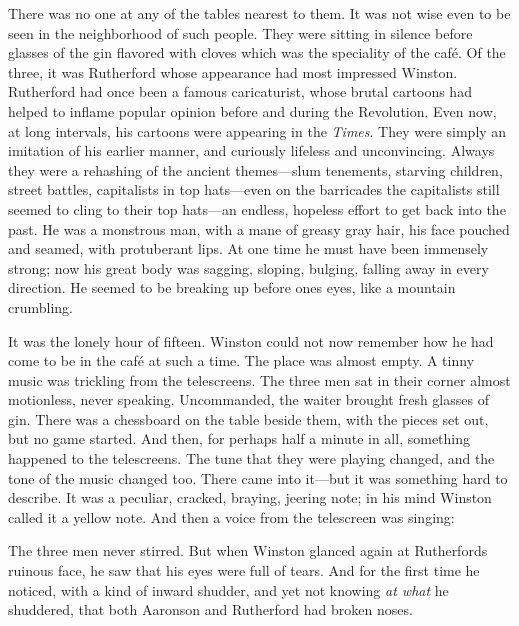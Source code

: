 There was no one at any of the tables nearest to them. It was not wise
even to be seen in the neighborhood of such people. They were sitting in
silence before glasses of the gin flavored with cloves which was the
speciality of the café. Of the three, it was Rutherford whose appearance
had most impressed Winston. Rutherford had once been a famous
caricaturist, whose brutal cartoons had helped to inflame popular
opinion before and during the Revolution. Even now, at long intervals,
his cartoons were appearing in the \emph{Times}. They were simply an
imitation of his earlier manner, and curiously lifeless and
unconvincing. Always they were a rehashing of the ancient themes---slum
tenements, starving children, street battles, capitalists in top
hats---even on the barricades the capitalists still seemed to cling to
their top hats---an endless, hopeless effort to get back into the past.
He was a monstrous man, with a mane of greasy gray hair, his face
pouched and seamed, with protuberant lips. At one time he must have been
immensely strong; now his great body was sagging, sloping, bulging,
falling away in every direction. He seemed to be breaking up before
one\textquotesingle s eyes, like a mountain crumbling.

It was the lonely hour of fifteen. Winston could not now remember how he
had come to be in the café at such a time. The place was almost empty. A
tinny music was trickling from the telescreens. The three men sat in
their corner almost motionless, never speaking. Uncommanded, the waiter
brought fresh glasses of gin. There was a chessboard on the table beside
them, with the pieces set out, but no game started. And then, for
perhaps half a minute in all, something happened to the telescreens. The
tune that they were playing changed, and the tone of the music changed
too. There came into it---but it was something hard to describe. It was
a peculiar, cracked, braying, jeering note; in his mind Winston called
it a yellow note. And then a voice from the telescreen was singing:


The three men never stirred. But when Winston glanced again at
Rutherford\textquotesingle s ruinous face, he saw that his eyes were
full of tears. And for the first time he noticed, with a kind of inward
shudder, and yet not knowing \emph{at what} he shuddered, that both
Aaronson and Rutherford had broken noses.

